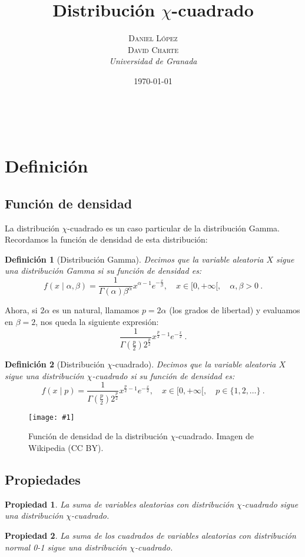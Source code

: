 \documentclass[a4paper, 10pt]{article} %
\title{\textbf{Distribución $\chi$-cuadrado}\\ %
\vspace{20 pt}
} %
\author{\textsc{Daniel López\\
David Charte} %
\\{\textit{Universidad de Granada}}} %
\date{\today} %
\makeatletter
\newcommand{\figura}[2]{\begin{figure}\centering \texttt{[image: \#1]} \caption{#2} \end{figure}}
\renewcommand{\maketitle}{ %
\begin{center} %
{\Huge\@title} %
\end{center}

\vspace{20pt} %

\begin{flushright} %
{\large\@author} %
\\\@date %

\vspace{40pt} %
\end{flushright}
\renewcommand{\baselinestretch}{0.5}

}
\newtheorem{definition}{Definición}[section]
\newtheorem{property}{Propiedad}[section]
\makeatother
\begin{document}
\maketitle
\tableofcontents
\setcounter{page}{1}
\pagebreak

\section{Definición}
\subsection{Función de densidad}
La distribución $\chi$-cuadrado es un caso particular de la distribución Gamma. Recordamos la función de densidad de esta distribución:

\begin{definition}[Distribución Gamma]
  Decimos que la variable aleatoria $X$ sigue una distribución Gamma si su función de densidad es:
  $$f(x\mid \alpha, \beta) = \frac 1 {\Gamma(\alpha)\beta^\alpha}x^{\alpha-1}e^{-\frac x \beta},\quad x\in[0,+\infty[,\quad \alpha,\beta>0~.$$
\end{definition}

Ahora, si $2\alpha$ es un natural, llamamos $p=2\alpha$ (los grados de libertad) y evaluamos en $\beta=2$, nos queda la siguiente expresión:
$$\frac 1 {\Gamma(\frac p 2)2^{\frac p 2}}x^{\frac p 2-1}e^{-\frac x 2}~.$$

\begin{definition}[Distribución $\chi$-cuadrado]
  Decimos que la variable aleatoria $X$ sigue una distribución $\chi$-cuadrado si su función de densidad es:
  $$f(x\mid p) = \frac 1 {\Gamma(\frac p 2)2^{\frac p 2}}x^{\frac p 2-1}e^{-\frac x 2},\quad x\in[0,+\infty[,\quad p\in\{1,2,\dots\}~.$$
\end{definition}

\figura{pdf.png}{Función de densidad de la distribución $\chi$-cuadrado. Imagen de Wikipedia (CC BY).}

\subsection{Propiedades}

\begin{property}
  La suma de variables aleatorias con distribución $\chi$-cuadrado sigue una distribución $\chi$-cuadrado.
\end{property}

\begin{property}
  La suma de los cuadrados de variables aleatorias con distribución normal 0-1 sigue una distribución $\chi$-cuadrado.
\end{property}
\end{document}
